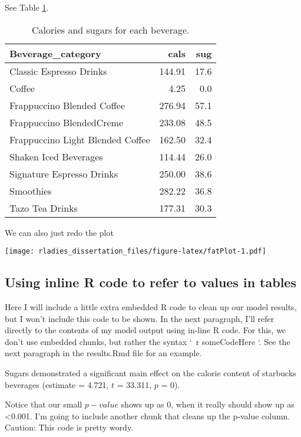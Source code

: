\documentclass[
  12pt,
  oneside]{book}
\numberwithin{figure}{chapter}
\begin{document}
See Table \ref{tab:calsugs-tab}.

\begin{table}[t]

\caption{\label{tab:calsugs-tab}Calories and sugars for each beverage.}
\centering
\begin{tabular}{lrr}
\toprule
Beverage\_category & cals & sug\\
\midrule
Classic Espresso Drinks & 144.91 & 17.6\\
Coffee & 4.25 & 0.0\\
Frappuccino Blended Coffee & 276.94 & 57.1\\
Frappuccino BlendedCreme & 233.08 & 48.5\\
Frappuccino Light Blended Coffee & 162.50 & 32.4\\
\addlinespace
Shaken Iced Beverages & 114.44 & 26.0\\
Signature Espresso Drinks & 250.00 & 38.6\\
Smoothies & 282.22 & 36.8\\
Tazo Tea Drinks & 177.31 & 30.3\\
\bottomrule
\end{tabular}
\end{table}

We can also just redo the plot

\texttt{[image: rladies\_dissertation\_files/figure-latex/fatPlot-1.pdf]}

\hypertarget{using-inline-r-code-to-refer-to-values-in-tables}{%
\subsection{Using inline R code to refer to values in tables}\label{using-inline-r-code-to-refer-to-values-in-tables}}

Here I will include a little extra embedded R code to clean up our model results, but I won't include this code to be shown. In the next paragraph, I'll refer directly to the contents of my model output using in-line R code. For this, we don't use embedded chunks, but rather the syntax `~r someCodeHere `. See the next paragraph in the results.Rmd file for an example.

Sugars demonstrated a significant main effect on the calorie content of starbucks beverages
(estimate = 4.721,
\(t\) = 33.311,
\(p\) = 0).

Notice that our small \(p-value\) shows up as 0, when it really should show up as \textless0.001. I'm going to include another chunk that cleans up the p-value column. Caution: This code is pretty wordy.
\end{document}
